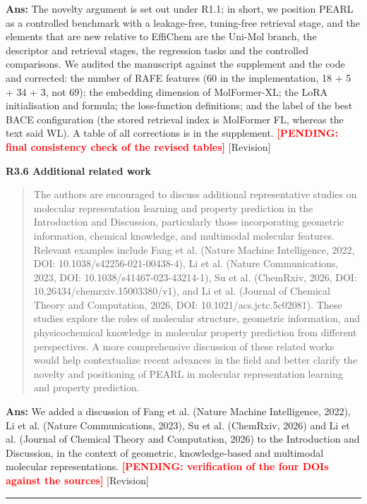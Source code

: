 \documentclass[
  10pt,
]{article}
\newcommand{\placeholder}[1]{\textcolor{red}{\textbf{[PENDING#1]}}}
\begin{document}
\textbf{Ans:} The novelty argument is set out under R1.1; in short, we
position PEARL as a controlled benchmark with a leakage-free,
tuning-free retrieval stage, and the elements that are new relative to
EffiChem are the Uni-Mol branch, the descriptor and retrieval stages,
the regression tasks and the controlled comparisons. We audited the
manuscript against the supplement and the code and corrected: the number
of RAFE features (60 in the implementation, 18 + 5 + 34 + 3, not 69);
the embedding dimension of MolFormer-XL; the LoRA initialisation and
formula; the loss-function definitions; and the label of the best BACE
configuration (the stored retrieval index is MolFormer FL, whereas the
text said WL). A table of all corrections is in the supplement.
\placeholder{: final consistency check of the revised tables}
{[}Revision{]}

\textbf{R3.6 Additional related work}

\begin{quote}
The authors are encouraged to discuss additional representative studies
on molecular representation learning and property prediction in the
Introduction and Discussion, particularly those incorporating geometric
information, chemical knowledge, and multimodal molecular features.
Relevant examples include Fang et al. (Nature Machine Intelligence,
2022, DOI: 10.1038/s42256-021-00438-4), Li et al. (Nature
Communications, 2023, DOI: 10.1038/s41467-023-43214-1), Su et al.
(ChemRxiv, 2026, DOI: 10.26434/chemrxiv.15003380/v1), and Li et al.
(Journal of Chemical Theory and Computation, 2026, DOI:
10.1021/acs.jctc.5c02081). These studies explore the roles of molecular
structure, geometric information, and physicochemical knowledge in
molecular property prediction from different perspectives. A more
comprehensive discussion of these related works would help contextualize
recent advances in the field and better clarify the novelty and
positioning of PEARL in molecular representation learning and property
prediction.
\end{quote}

\textbf{Ans:} We added a discussion of Fang et al. (Nature Machine
Intelligence, 2022), Li et al. (Nature Communications, 2023), Su et al.
(ChemRxiv, 2026) and Li et al. (Journal of Chemical Theory and
Computation, 2026) to the Introduction and Discussion, in the context of
geometric, knowledge-based and multimodal molecular representations.
\placeholder{: verification of the four DOIs against the
sources} {[}Revision{]}

\begin{center}\rule{0.5\linewidth}{0.5pt}\end{center}
\end{document}

